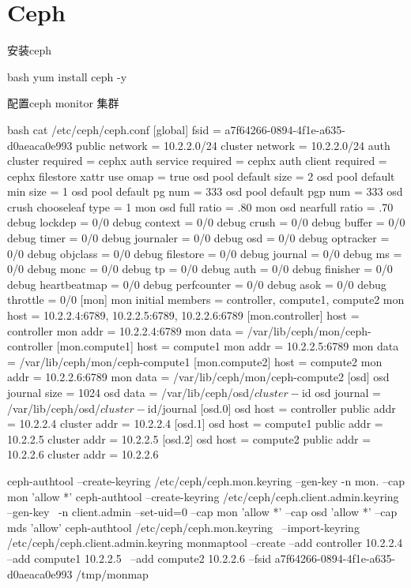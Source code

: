 \chapter{Ceph}

\begin{outline}[enumerate]
  \1 安装ceph
\begin{code-in-enumerate}{bash}
yum install ceph -y
\end{code-in-enumerate}

  \1 配置ceph monitor 集群
\begin{code-in-enumerate}{bash}
cat /etc/ceph/ceph.conf
[global]
fsid = a7f64266-0894-4f1e-a635-d0aeaca0e993
public network = 10.2.2.0/24
cluster network = 10.2.2.0/24
auth cluster required = cephx
auth service required = cephx
auth client required = cephx
filestore xattr use omap = true
osd pool default size = 2
osd pool default min size = 1
osd pool default pg num = 333
osd pool default pgp num = 333
osd crush chooseleaf type = 1
mon osd full ratio = .80
mon osd nearfull ratio = .70
debug lockdep = 0/0
debug context = 0/0
debug crush = 0/0
debug buffer = 0/0
debug timer = 0/0
debug journaler = 0/0
debug osd = 0/0
debug optracker = 0/0
debug objclass = 0/0
debug filestore = 0/0
debug journal = 0/0
debug ms = 0/0
debug monc = 0/0
debug tp = 0/0
debug auth = 0/0
debug finisher = 0/0
debug heartbeatmap = 0/0
debug perfcounter = 0/0
debug asok = 0/0
debug throttle = 0/0
[mon]
mon initial members = controller, compute1, compute2
mon host = 10.2.2.4:6789, 10.2.2.5:6789, 10.2.2.6:6789
[mon.controller]
host = controller
mon addr = 10.2.2.4:6789
mon data = /var/lib/ceph/mon/ceph-controller
[mon.compute1]
host = compute1
mon addr = 10.2.2.5:6789
mon data = /var/lib/ceph/mon/ceph-compute1
[mon.compute2]
host = compute2
mon addr = 10.2.2.6:6789
mon data = /var/lib/ceph/mon/ceph-compute2
[osd]
osd journal size = 1024
osd data = /var/lib/ceph/osd/$cluster-$id
osd journal = /var/lib/ceph/osd/$cluster-$id/journal
[osd.0]
osd host = controller
public addr = 10.2.2.4
cluster addr = 10.2.2.4
[osd.1]
osd host = compute1
public addr = 10.2.2.5
cluster addr = 10.2.2.5
[osd.2]
osd host = compute2
public addr = 10.2.2.6
cluster addr = 10.2.2.6

ceph-authtool --create-keyring /etc/ceph/ceph.mon.keyring --gen-key -n mon. --cap mon 'allow *'
ceph-authtool --create-keyring /etc/ceph/ceph.client.admin.keyring --gen-key \
    -n client.admin --set-uid=0 --cap mon 'allow *' --cap osd 'allow *' --cap mds 'allow'
ceph-authtool /etc/ceph/ceph.mon.keyring \
    --import-keyring /etc/ceph/ceph.client.admin.keyring
monmaptool --create --add controller 10.2.2.4 --add compute1 10.2.2.5 \
    --add compute2 10.2.2.6  --fsid a7f64266-0894-4f1e-a635-d0aeaca0e993 /tmp/monmap


\end{code-in-enumerate}
\end{outline}
